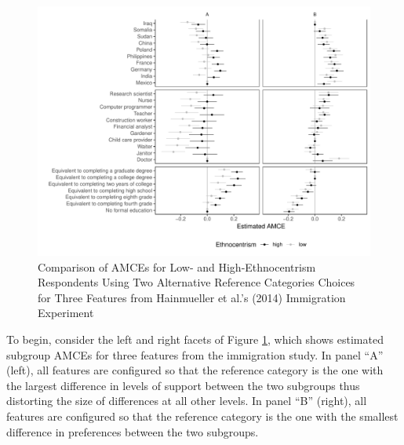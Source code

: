 \documentclass[a4paper,12pt]{article}\usepackage[]{graphicx}\usepackage[]{color}
\makeatletter
\def\maxwidth{ %
  \ifdim\Gin@nat@width>\linewidth
    \linewidth
  \else
    \Gin@nat@width
  \fi
}
\newenvironment{knitrout}{}{} %
\makeatother
\begin{document}
\begin{knitrout}
\color{fgcolor}\begin{figure}
\includegraphics[width=\maxwidth]{figure/hainmueller_subgroup_example_plot-1} \caption[Comparison of AMCEs for Low- and High-Ethnocentrism Respondents Using Two Alternative Reference Categories Choices for Three Features from Hainmueller et al.'s (2014) Immigration Experiment]{Comparison of AMCEs for Low- and High-Ethnocentrism Respondents Using Two Alternative Reference Categories Choices for Three Features from Hainmueller et al.'s (2014) Immigration Experiment}\label{fig:hainmueller_subgroup_example_plot}
\end{figure}


\end{knitrout}

To begin, consider the left and right facets of Figure \ref{fig:hainmueller_subgroup_example_plot}, which shows estimated subgroup AMCEs for three features from the immigration study. In panel ``A'' (left), all features are configured so that the reference category is the one with the largest difference in levels of support between the two subgroups thus distorting the size of differences at all other levels. In panel ``B'' (right), all features are configured so that the reference category is the one with the smallest difference in preferences between the two subgroups.
\end{document}
